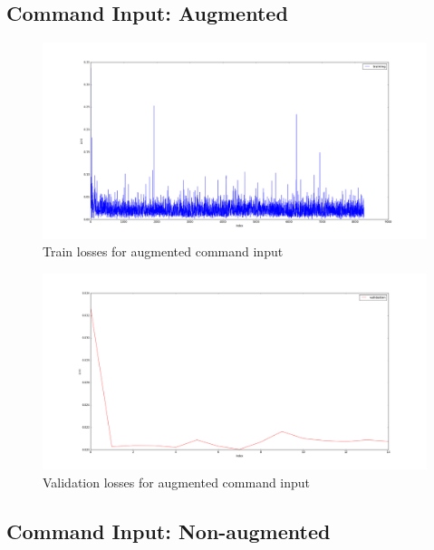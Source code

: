 \documentclass[a4paper]{article}
\begin{document}
\subsection{Command Input: Augmented}
\begin{minipage}{0.45\textwidth}
  \begin{figure}[H]
    \centering
    \includegraphics[width=\textwidth]{../pics/command_input_training_augmented.png}
    \caption{Train losses for augmented command input}
    \label{fig:augmented_command_train_loss}
  \end{figure}
\end{minipage}
\begin{minipage}{0.45\textwidth}
  \begin{figure}[H]
    \centering
    \includegraphics[width=\textwidth]{../pics/command_input_validation_augmented.png}
    
    \caption{Validation losses for augmented command input}
    \label{fig:augmented_command_eval_loss}
  \end{figure}

\end{minipage}




\subsection{Command Input: Non-augmented}
\end{document}
